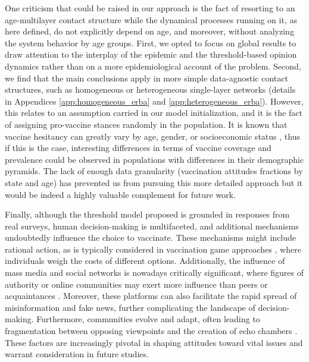 \documentclass[
 reprint,
 amsmath,amssymb,
 aps,
]{revtex4-2}
\begin{document}
One criticism that could be raised in our approach is the fact of resorting to an age-multilayer contact structure while the dynamical processes running on it, as here defined, do not explicitly depend on age, and moreover, without analyzing the system behavior by age groups. First, we opted to focus on global results to draw attention to the interplay of the epidemic and the threshold-based opinion dynamics rather than on a more epidemiological account of the problem. Second, we find that the main conclusions apply in more simple data-agnostic contact structures, such as homogeneous or heterogeneous single-layer networks (details in Appendices \ref{app:homogeneous_erba} and \ref{app:heterogeneous_erba}). However, this relates to an assumption carried in our model initialization, and it is the fact of assigning pro-vaccine stances randomly in the population. It is known that vaccine hesitancy can greatly vary by age, gender, or socioeconomic status \cite{troiano2021vaccine, morales2022gender}, thus if this is the case, interesting differences in terms of vaccine coverage and prevalence could be observed in populations with differences in their demographic pyramids. The lack of enough data granularity (vaccination attitudes fractions by state and age) has prevented us from pursuing this more detailed approach but it would be indeed a highly valuable complement for future work.

Finally, although the threshold model proposed is grounded in responses from real surveys, human decision-making is multifaceted, and additional mechanisms undoubtedly influence the choice to vaccinate. These mechanisms might include rational action, as is typically considered in vaccination game approaches \cite{wang2015coupled, iwamura2018realistic}, where individuals weigh the costs of different options. Additionally, the influence of mass media and social networks is nowadays critically significant, where figures of authority or online communities may exert more influence than peers or acquaintances \cite{yuan2017cyber, wilson2020social, jain2022dynamics, rathje2022social}. Moreover, these platforms can also facilitate the rapid spread of misinformation and fake news, further complicating the landscape of decision-making. Furthermore, communities evolve and adapt, often leading to fragmentation between opposing viewpoints and the creation of echo chambers \cite{schmidt2018polarization, jennings2021lack, muller2022echo}. These factors are increasingly pivotal in shaping attitudes toward vital issues and warrant consideration in future studies.
\end{document}
